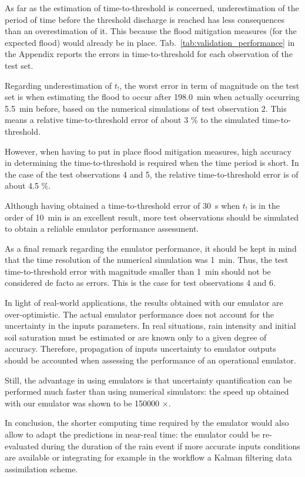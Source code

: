 As far as the estimation of time-to-threshold is concerned, underestimation of the period of time before the threshold discharge is reached has less consequences than an overestimation of it. This because the flood mitigation measures (for the expected flood) would already be in place. 
Tab.~\ref{tab:validation_performance} in the Appendix reports the errors in time-to-threshold for each observation of the test set.

Regarding underestimation of $t_!$, the worst error in term of magnitude on the test set is when estimating the flood to occur after \SI{198.0}{\minute} when actually occurring \SI{5.5}{\minute} before, based on the numerical simulations of test observation 2.
This means a relative time-to-threshold error of about 3 \% to the simulated time-to-threshold. 

However, when having to put in place flood mitigation measures, high accuracy in determining the time-to-threshold is required when the time period is short. In the case of the test observations 4 and 5, the relative time-to-threshold error is of about 4.5 \%. 

Although having obtained a time-to-threshold error of \SI{30}{\s}  when $t_!$ is in the order of \SI{10}{\minute} is an excellent result, more test observations should be simulated to obtain a reliable emulator performance assessment.
 
As a final remark regarding the emulator performance, it should be kept in mind that the time resolution of the numerical simulation was \SI{1}{\minute}. Thus, the test time-to-threshold error with magnitude smaller than \SI{1}{min} should not be considered de facto as errors. This is the case for test observations 4 and 6. 

In light of real-world applications, the results obtained with our emulator are over-optimistic.
The actual emulator performance does not account for the uncertainty in the inputs parameters. 
In real situations, rain intensity and initial soil saturation must be estimated or are known only to a given degree of accuracy. 
Therefore, propagation of inputs uncertainty to emulator outputs should be accounted when assessing the performance of an operational emulator.

Still, the advantage in using emulators is that uncertainty quantification can be performed much faster than using numerical simulators: the speed up obtained with our emulator was shown to be \num{150000} $\times$. 

In conclusion, the shorter computing time required by the emulator would also allow to adapt the predictions in near-real time: the emulator could be re-evaluated during the duration of the rain event if more accurate inputs conditions are available or integrating for example in the workflow a Kalman filtering data assimilation scheme. 
 
 
 



